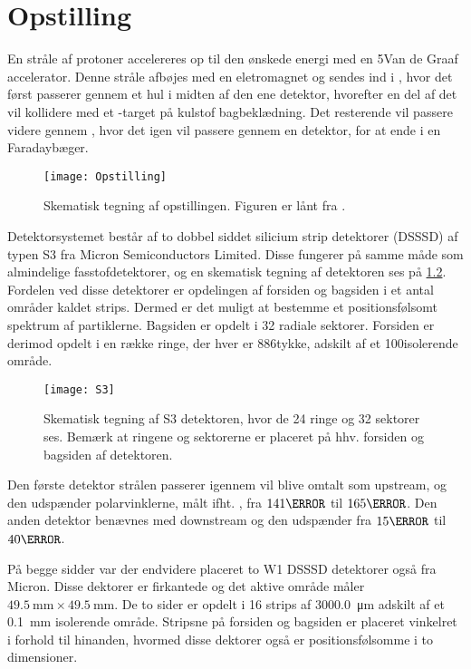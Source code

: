\chapter{Opstilling}
\label{cha:opstilling}

En stråle af protoner accelereres op til den ønskede energi med en 5\MV Van de Graaf
accelerator. Denne stråle afbøjes med en eletromagnet og sendes ind i \beamline, hvor det først
passerer gennem et hul i midten af den ene detektor, hvorefter en del af det vil kollidere med et
-target på kulstof bagbeklædning.
Det resterende vil passere videre gennem \beamline, hvor det igen vil passere gennem en detektor, for
at ende i en Faradaybæger.
\begin{figure}[h]
  \centering
  \texttt{[image: Opstilling]}
  \caption{Skematisk tegning af opstillingen. Figuren er lånt fra \cite{Knudsen}.}
  \label{fig:opstilling}
\end{figure}

Detektorsystemet består af to dobbel siddet silicium strip detektorer (DSSSD) af typen S3 fra Micron
Semiconductors Limited.    Disse
fungerer på samme måde som almindelige fasstofdetektorer, og en skematisk tegning af detektoren ses
på \cref{fig:S3}.  Fordelen ved disse detektorer er opdelingen af forsiden og bagsiden i et antal
områder kaldet strips. Dermed er det muligt at bestemme et positionsfølsomt spektrum af
partiklerne. Bagsiden er opdelt i 32 radiale sektorer. Forsiden er derimod
opdelt i en række ringe, der hver er 886\um tykke, adskilt af et 100\um isolerende område.
\begin{figure}[hbt]
  \centering
  \texttt{[image: S3]}
  \caption{Skematisk tegning af S3 detektoren, hvor de 24 ringe og 32 sektorer ses. Bemærk at
  ringene og sektorerne er placeret på hhv. forsiden og bagsiden af detektoren.}
  \label{fig:S3}
\end{figure}

Den første detektor strålen passerer igennem vil blive omtalt som upstream, og den udspænder
polarvinklerne, målt ifht. \beamline, fra $141\degree$ til $165\degree$. Den anden detektor benævnes
med downstream og den udspænder fra $15\degree$ til $40\degree$.

På begge sidder var der endvidere placeret to W1 DSSSD detektorer også fra Micron. Disse dektorer er
firkantede og det aktive område måler ${\SI{49.5}{\mm} \times \SI{49.5}{\mm}}$. De to sider er
opdelt i 16 strips af \SI{3000.0}{\um} adskilt af et \SI{0.1}{\mm} isolerende område. Stripsne på
forsiden og bagsiden er placeret vinkelret i forhold til hinanden, hvormed disse dektorer også er
positionsfølsomme i to dimensioner.

